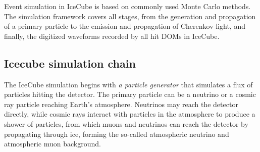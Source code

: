 Event simulation in IceCube is based on commonly used Monte Carlo methods. The simulation framework covers all stages, from the generation and propagation of a primary particle to the emission and propagation of Cherenkov light, and finally, the digitized waveforms recorded by all hit DOMs in IceCube. 

\subsection{Icecube simulation chain}
\label{sec:sim_ic}
The IceCube simulation begins with \emph{a particle generator} that simulates a flux of particles hitting the detector. The primary particle can be a neutrino or a cosmic ray particle reaching Earth's atmosphere. Neutrinos may reach the detector directly, while cosmic rays interact with particles in the atmosphere to produce a shower of particles, from which muons and neutrinos can reach the detector by propagating through ice, forming the so-called atmospheric neutrino and atmospheric muon background.

